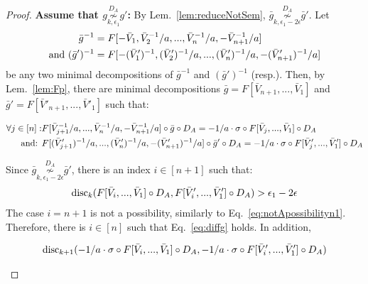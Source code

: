 \documentclass{article} %
\newcommand{\disc}{\textnormal{disc}}
\begin{document}
\begin{proof}
\textbf{Assume that $g \overset{D_A}{\underset{k,\epsilon_1}{\not\sim}} g'$:} By Lem.~\ref{lem:reduceNotSem}, $\bar{g} \overset{D_A}{\underset{k,\epsilon_1-2\epsilon}{\not\sim}} \bar{g}'$. Let 
\begin{equation}
\begin{aligned}
\bar{g}^{-1} &= F[-\bar{V}_1,\bar{V}^{-1}_2/a,...,\bar{V}^{-1}_n/a,-\bar{V}^{-1}_{n+1}/a]\\
\textnormal{and }(\bar{g}')^{-1} &= F[-(\bar{V}'_1)^{-1},(\bar{V}'_2)^{-1}/a,...,(\bar{V}'_n)^{-1}/a,-(\bar{V}'_{n+1})^{-1}/a]
\end{aligned}
\end{equation}
be any two minimal decompositions of $\bar{g}^{-1}$ and $(\bar{g}')^{-1}$ (resp.). Then, by Lem.~\ref{lem:Fp}, there are minimal decompositions $\bar{g} = F[\bar{V}_{n+1},...,\bar{V}_1]$ and $\bar{g}' = F[\bar{V}'_{n+1},...,\bar{V}'_1]$ such that:
\begin{small}
\begin{equation}
\begin{aligned}
\forall j \in [n]: & F[\bar{V}^{-1}_{j+1}/a,...,\bar{V}^{-1}_n/a,-\bar{V}^{-1}_{n+1}/a] \circ \bar{g} \circ D_A = -1/a \cdot \sigma \circ F[\bar{V}_{j},...,\bar{V}_1] \circ D_A \\
\textnormal{and: } & F[(\bar{V}'_{j+1})^{-1}/a,...,(\bar{V}'_n)^{-1}/a,-(\bar{V}'_{n+1})^{-1}/a] \circ \bar{g}' \circ D_A = -1/a \cdot \sigma \circ F[\bar{V}'_{j},...,\bar{V}'_1] \circ D_A
\end{aligned}
\end{equation}
\end{small}
Since $\bar{g} \overset{D_A}{\underset{k,\epsilon_1-2\epsilon}{\not\sim}} \bar{g}'$, there is an index $i \in [n+1]$ such that:
\begin{equation}\label{eq:diffg}
\begin{aligned}
&\disc_k(F[\bar{V}_i,...,\bar{V}_1] \circ D_A,F[\bar{V}'_i,...,\bar{V}'_1] \circ D_A) > \epsilon_1 - 2\epsilon\\
\end{aligned}
\end{equation}
The case $i=n+1$ is not a possibility, similarly to Eq.~\ref{eq:notApossibilityn1}. Therefore, there is $i \in [n]$ such that Eq.~\ref{eq:diffg} holds. In addition,
\begin{small}
\begin{equation}
\begin{aligned}
&\disc_{k+1}(-1/a \cdot \sigma \circ F[\bar{V}_i,...,\bar{V}_1] \circ D_A, -1/a \cdot  \sigma\circ F[\bar{V}'_i,...,\bar{V}'_1] \circ D_A) \\

\end{aligned}
\end{equation}
\end{small}
\end{proof}
\end{document}

